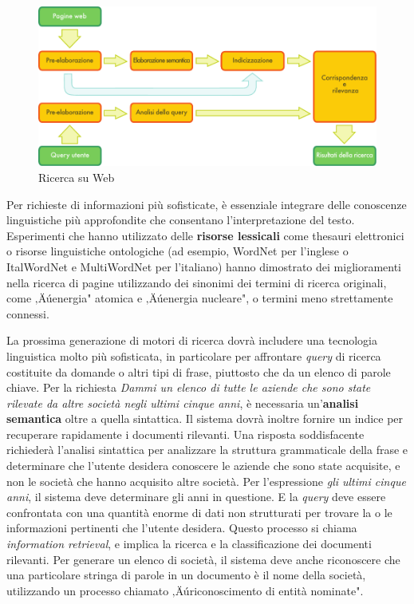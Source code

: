 \begin{multicols}{2}
\begin{figure}[htb]
  \center
  \includegraphics[width=\textwidth]{../_media/italian/web_search_architecture}
  \caption{Ricerca su Web}
  \label{fig:websearcharch_de}
\end{figure}

Per richieste di informazioni pi\`{u} sofisticate, \`{e} essenziale integrare
delle conoscenze linguistiche pi\`{u} approfondite che consentano
l'interpretazione del testo. Esperimenti che hanno utilizzato delle
\textbf{risorse lessicali} come thesauri elettronici o risorse linguistiche
ontologiche (ad esempio, WordNet per l'inglese o ItalWordNet e MultiWordNet
per l'italiano) hanno dimostrato dei miglioramenti nella ricerca di pagine
utilizzando dei sinonimi dei termini di ricerca originali, come ‚Äúenergia"
atomica e ‚Äúenergia nucleare", o termini meno strettamente connessi.

La prossima generazione di motori di ricerca dovr\`{a} includere una
tecnologia linguistica molto pi\`{u} sofisticata, in particolare per
affrontare \emph{query} di ricerca costituite da domande o altri tipi di
frase, piuttosto che da un elenco di parole chiave. Per la richiesta \emph{Dammi un
elenco di tutte le aziende che sono state rilevate da altre societ\`{a} negli
ultimi cinque anni}, \`{e} necessaria un'\textbf{analisi semantica} oltre a quella sintattica. Il sistema dovr\`{a} inoltre fornire un indice per recuperare rapidamente i documenti rilevanti. Una risposta soddisfacente
richieder\`{a} l'analisi sintattica per analizzare la struttura grammaticale
della frase e determinare che l'utente desidera conoscere le aziende che sono
state acquisite, e non le societ\`{a} che hanno acquisito altre
societ\`{a}. Per l'espressione \emph{gli ultimi cinque anni}, il sistema deve
determinare gli anni in questione. E la \emph{query} deve essere confrontata
con una quantit\`{a} enorme di dati non strutturati per trovare la o le
informazioni pertinenti che l'utente desidera. Questo processo si chiama
\emph{information retrieval}, e implica la ricerca e la classificazione dei 
documenti rilevanti. Per generare un elenco di societ\`{a}, il sistema deve 
anche riconoscere che una particolare stringa di parole in un documento \`{e} 
il nome della societ\`{a}, utilizzando un processo chiamato ‚Äúriconoscimento di entit\`{a}
nominate".


\end{multicols}
